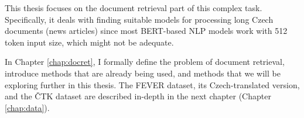 This thesis focuses on the document retrieval part of this complex task.
Specifically, it deals with finding suitable models for processing long Czech documents (news articles) since most BERT-based NLP models work with 512 token input size, which might not be adequate.

In Chapter \ref{chap:docret}, I formally define the problem of document retrieval, introduce methods that are already being used, and methods that we will be exploring further in this thesis. 
The FEVER dataset, its Czech-translated version, and the ČTK dataset are described in-depth in the next chapter (Chapter \ref{chap:data}).
